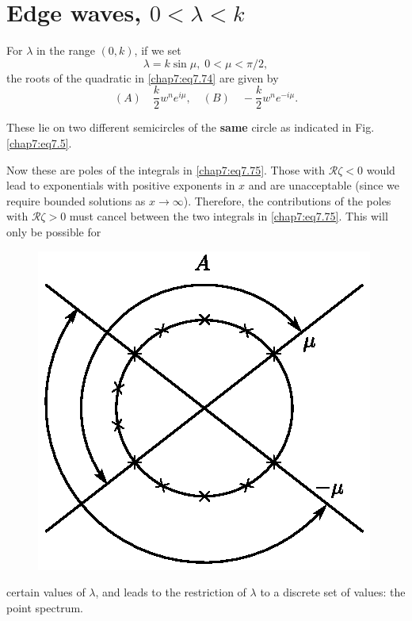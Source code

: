 {{\section{Edge waves, $0<\lambda <k$}\label{chap7:sec7.7}

For $\lambda$ in the range $(0,k)$, if we set 
\begin{equation}
\lambda=k\sin\mu, \; 0<\mu <\pi/2,\tag{7.86}\label{chap7:eq7.86}
\end{equation}
the roots of the quadratic in \eqref{chap7:eq7.74} are given by
\begin{equation}
(A)\quad \frac{k}{2}w^n e^{i\mu},\quad (B)\quad -\frac{k}{2}w^n e^{-i\mu}. \tag{7.87}\label{chap7:eq7.87}
\end{equation}

These lie on two different semicircles of the {\bf same} circle as indicated in Fig. \ref{chap7:eq7.5}.

Now these are poles of the integrals in \eqref{chap7:eq7.75}. Those with $\mathscr{R}\zeta <0$ would lead to exponentials with positive exponents in $x$ and are unacceptable (since we require bounded solutions as $x\to\infty$). Therefore, the contributions of the poles with $\mathscr{R}\zeta >0$ must cancel between the two integrals in \eqref{chap7:eq7.75}. This will only be possible for 
\begin{figure}[H]
\centering
\includegraphics{figures/fig61-7.5.eps}
\caption{}
\label{chap1:fig7.5}
\end{figure}\pageoriginale
\noindent
certain values of $\lambda$, and leads to the restriction of $\lambda$ to a discrete set of values: the point spectrum.

}}
